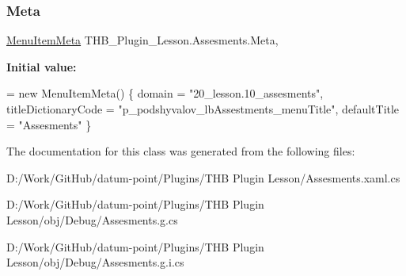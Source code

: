 \subsubsection{\texorpdfstring{Meta}{Meta}}
{\footnotesize\ttfamily \mbox{\hyperlink{class_uniform_client_1_1_plugins_1_1_menu_item_meta}{Menu\+Item\+Meta}} T\+H\+B\+\_\+\+Plugin\+\_\+\+Lesson.\+Assesments.\+Meta\hspace{0.3cm}{\ttfamily [get]}, {\ttfamily [set]}}

{\bfseries Initial value\+:}
\begin{DoxyCode}
= \textcolor{keyword}{new} MenuItemMeta()
        \{
            domain = \textcolor{stringliteral}{"20\_lesson.10\_assesments"},
            titleDictionaryCode = \textcolor{stringliteral}{"p\_podshyvalov\_lbAssestments\_menuTitle"},
            defaultTitle = \textcolor{stringliteral}{"Assesments"}
        \}
\end{DoxyCode}


The documentation for this class was generated from the following files\+:\begin{DoxyCompactItemize}
\item 
D\+:/\+Work/\+Git\+Hub/datum-\/point/\+Plugins/\+T\+H\+B Plugin Lesson/Assesments.\+xaml.\+cs\item 
D\+:/\+Work/\+Git\+Hub/datum-\/point/\+Plugins/\+T\+H\+B Plugin Lesson/obj/\+Debug/Assesments.\+g.\+cs\item 
D\+:/\+Work/\+Git\+Hub/datum-\/point/\+Plugins/\+T\+H\+B Plugin Lesson/obj/\+Debug/Assesments.\+g.\+i.\+cs\end{DoxyCompactItemize}
